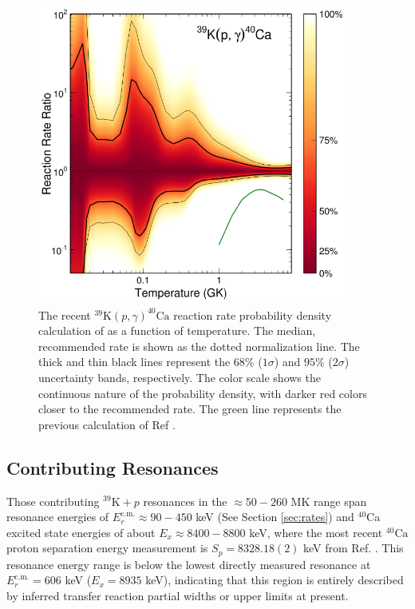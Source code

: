 \begin{figure}[t]
\centering
\includegraphics[width=4in]{Chapter-6/figs/39K_p_g_Longland2018.png}
\caption{\label{fig:39K_p_g_Longland}The recent $^{39}\mathrm{K}(p,\gamma)^{40}\mathrm{Ca}$ reaction rate probability density calculation of \cite{Longland2018} as a function of temperature. The median, recommended rate is shown as the dotted normalization line. The thick and thin black lines represent the $68\%$ ($1\sigma$) and $95\%$ ($2\sigma$) uncertainty bands, respectively. The color scale shows the continuous nature of the probability density, with darker red colors closer to the recommended rate. The green line represents the previous calculation of Ref \cite{Cheng1981}.}
\end{figure}

\subsection{Contributing Resonances}

Those contributing $^{39}\mathrm{K}+p$ resonances in the $\approx50-260$ MK range span resonance energies of $E^{\mathrm{c.m.}}_{r} \approx 90-450$ keV (See Section \ref{sec:rates}) and $^{40}$Ca excited state energies of about $E_{x} \approx 8400-8800$ keV, where the most recent $^{40}\mathrm{Ca}$ proton separation energy measurement is $S_{p} = 8328.18(2)$ keV from Ref. \cite{Wang2021}. This resonance energy range is below the lowest directly measured resonance at $E^{\mathrm{c.m.}}_{r} = 606$ keV ($E_{x} = 8935$ keV), indicating that this region is entirely described by inferred transfer reaction partial widths or upper limits at present.

